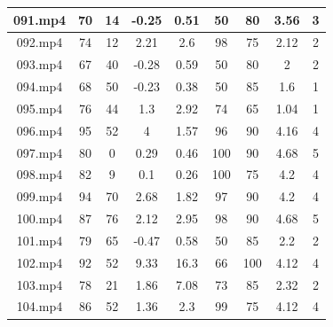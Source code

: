 \begin{table}[H]
\begin{tabular}{|c|c|c|c|c|c|c|c|c|}
			091.mp4 & 70      & 14      & -0.25   & 0.51      & 50          & 80          & 3.56 & 3     \\ \hline
			092.mp4 & 74      & 12      & 2.21    & 2.6       & 98          & 75          & 2.12 & 2     \\ \hline
			093.mp4 & 67      & 40      & -0.28   & 0.59      & 50          & 80          & 2    & 2     \\ \hline
			094.mp4 & 68      & 50      & -0.23   & 0.38      & 50          & 85          & 1.6  & 1     \\ \hline
			095.mp4 & 76      & 44      & 1.3     & 2.92      & 74          & 65          & 1.04 & 1     \\ \hline
			096.mp4 & 95      & 52      & 4       & 1.57      & 96          & 90          & 4.16 & 4     \\ \hline
			097.mp4 & 80      & 0       & 0.29    & 0.46      & 100         & 90          & 4.68 & 5     \\ \hline
			098.mp4 & 82      & 9       & 0.1     & 0.26      & 100         & 75          & 4.2  & 4     \\ \hline
			099.mp4 & 94      & 70      & 2.68    & 1.82      & 97          & 90          & 4.2  & 4     \\ \hline
			100.mp4 & 87      & 76      & 2.12    & 2.95      & 98          & 90          & 4.68 & 5     \\ \hline
			101.mp4 & 79      & 65      & -0.47   & 0.58      & 50          & 85          & 2.2  & 2     \\ \hline
			102.mp4 & 92      & 52      & 9.33    & 16.3      & 66          & 100         & 4.12 & 4     \\ \hline
			103.mp4 & 78      & 21      & 1.86    & 7.08      & 73          & 85          & 2.32 & 2     \\ \hline
			104.mp4 & 86      & 52      & 1.36    & 2.3       & 99          & 75          & 4.12 & 4     \\ \hline
		\end{tabular}
\end{table}

